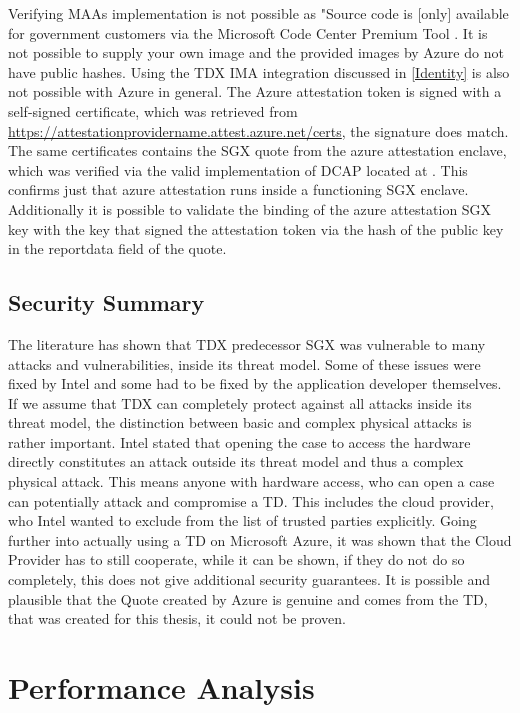 Verifying MAAs implementation is not possible as \guillemotright"Source code is [only] available for government customers via the Microsoft Code Center Premium Tool \guillemotleft \cite{dan_mabee_azure_attestation_2023}. It is not possible to supply your own image and the provided images by Azure do not have public hashes. Using the TDX IMA integration discussed in \ref{Identity} is also not possible with Azure in general.
The Azure attestation token is signed with a self-signed certificate, which was retrieved from \url{https://attestationprovidername.attest.azure.net/certs}, the signature does match. The same certificates contains the SGX quote from the azure attestation enclave, which was verified via the valid implementation of DCAP located at \cite{microsoft_corporation_azure-samplesmicrosoft-azure-attestation_nodate}. This confirms just that azure attestation runs inside a functioning SGX enclave. Additionally it is possible to validate the binding of the azure attestation SGX key with the key that signed the attestation token via the hash of the public key in the reportdata field of the quote.

\section{Security Summary}

The literature has shown that TDX predecessor SGX was vulnerable to many attacks and vulnerabilities, inside its threat model. Some of these issues were fixed by Intel and some had to be fixed by the application developer themselves. If we assume that TDX can completely protect against all attacks inside its threat model, the distinction between basic and complex physical attacks is rather important. Intel stated that opening the case to access the hardware directly constitutes an attack outside its threat model and thus a complex physical attack. This means anyone with hardware access, who can open a case can potentially attack and compromise a TD. This includes the cloud provider, who Intel wanted to exclude from the list of trusted parties explicitly.
Going further into actually using a TD on Microsoft Azure, it was shown that the Cloud Provider has to still cooperate, while it can be shown, if they do not do so completely, this does not give additional security guarantees. It is possible and plausible that the Quote created by Azure is genuine and comes from the TD, that was created for this thesis, it could not be proven.

\chapter{Performance Analysis}

